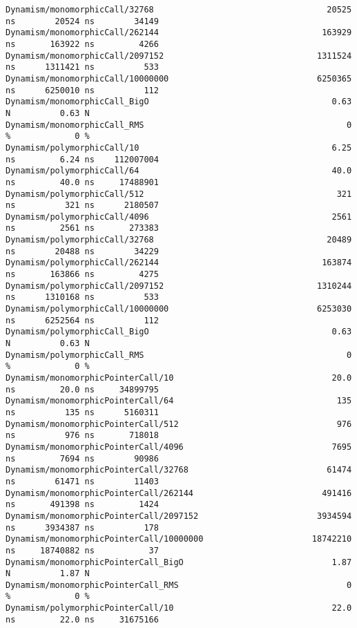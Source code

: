 \begin{code}
\begin{verbatim}
Dynamism/monomorphicCall/32768                                   20525 ns        20524 ns        34149
Dynamism/monomorphicCall/262144                                 163929 ns       163922 ns         4266
Dynamism/monomorphicCall/2097152                               1311524 ns      1311421 ns          533
Dynamism/monomorphicCall/10000000                              6250365 ns      6250010 ns          112
Dynamism/monomorphicCall_BigO                                     0.63 N          0.63 N
Dynamism/monomorphicCall_RMS                                         0 %             0 %
Dynamism/polymorphicCall/10                                       6.25 ns         6.24 ns    112007004
Dynamism/polymorphicCall/64                                       40.0 ns         40.0 ns     17488901
Dynamism/polymorphicCall/512                                       321 ns          321 ns      2180507
Dynamism/polymorphicCall/4096                                     2561 ns         2561 ns       273383
Dynamism/polymorphicCall/32768                                   20489 ns        20488 ns        34229
Dynamism/polymorphicCall/262144                                 163874 ns       163866 ns         4275
Dynamism/polymorphicCall/2097152                               1310244 ns      1310168 ns          533
Dynamism/polymorphicCall/10000000                              6253030 ns      6252564 ns          112
Dynamism/polymorphicCall_BigO                                     0.63 N          0.63 N
Dynamism/polymorphicCall_RMS                                         0 %             0 %
Dynamism/monomorphicPointerCall/10                                20.0 ns         20.0 ns     34899795
Dynamism/monomorphicPointerCall/64                                 135 ns          135 ns      5160311
Dynamism/monomorphicPointerCall/512                                976 ns          976 ns       718018
Dynamism/monomorphicPointerCall/4096                              7695 ns         7694 ns        90986
Dynamism/monomorphicPointerCall/32768                            61474 ns        61471 ns        11403
Dynamism/monomorphicPointerCall/262144                          491416 ns       491398 ns         1424
Dynamism/monomorphicPointerCall/2097152                        3934594 ns      3934387 ns          178
Dynamism/monomorphicPointerCall/10000000                      18742210 ns     18740882 ns           37
Dynamism/monomorphicPointerCall_BigO                              1.87 N          1.87 N
Dynamism/monomorphicPointerCall_RMS                                  0 %             0 %
Dynamism/polymorphicPointerCall/10                                22.0 ns         22.0 ns     31675166

\end{verbatim}
\end{code}
